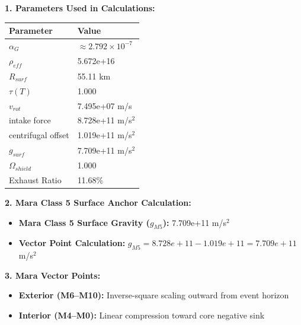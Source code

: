 \documentclass[11pt, a4paper]{article}
\begin{document}
\vspace{0.5em}
\noindent \textbf{1. Parameters Used in Calculations:}
\begin{center}
  \begin{tabular}{|l|l|}
    \hline
    \textbf{Parameter} & \textbf{Value} \\ \hline
    $\alpha_G$ & $\approx 2.792 \times 10^{-7}$ \\ \hline
    $\rho_{eff}$ & 5.672e+16 \\ \hline
    $R_{surf}$ & 55.11 km \\ \hline
    $\tau(T)$ & 1.000 \\ \hline
    $v_{rot}$ & 7.495e+07 m/s \\ \hline
    intake force & 8.728e+11 m/s$^2$ \\ \hline
    centrifugal offset & 1.019e+11 m/s$^2$ \\ \hline
    $g_{surf}$ & 7.709e+11 m/s$^2$ \\ \hline
    $\Omega_{shield}$ & 1.000 \\ \hline
    Exhaust Ratio & 11.68\% \\ \hline
  \end{tabular}
\end{center}

\vspace{0.5em}
\noindent \textbf{2. Mara Class 5 Surface Anchor Calculation:}
\begin{itemize}
  \item \textbf{Mara Class 5 Surface Gravity ($g_{M5}$):} 7.709e+11 m/s$^2$
  \item \textbf{Vector Point Calculation:} $g_{M5} = 8.728e+11 - 1.019e+11 = 7.709e+11$ m/s$^2$
\end{itemize}

\vspace{0.5em}
\noindent \textbf{3. Mara Vector Points:}
\begin{itemize}
  \item \textbf{Exterior (M6--M10):} Inverse-square scaling outward from event horizon
  \item \textbf{Interior (M4--M0):} Linear compression toward core negative sink
\end{itemize}
\end{document}

